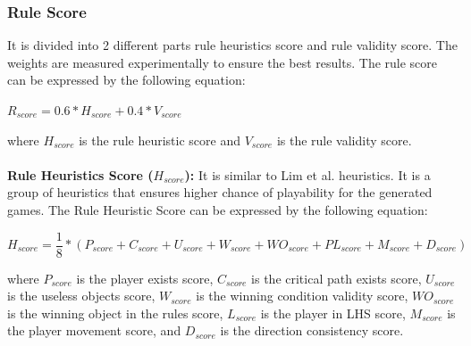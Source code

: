 \subsubsection{Rule Score}
It is divided into 2 different parts rule heuristics score and rule validity score. The weights are measured experimentally to ensure the best results. The rule score can be expressed by the following equation:
\begin{center}
$R_{score} = 0.6 * H_{score} + 0.4 * V_{score}$
\end{center}
where $H_{score}$ is the rule heuristic score and $V_{score}$ is the rule validity score.\\\\
\textbf{Rule Heuristics Score ($H_{score}$):} It is similar to Lim et al.\cite{puzzleScriptGeneration} heuristics. It is a group of heuristics that ensures higher chance of playability for the generated games. The Rule Heuristic Score can be expressed by the following equation:
\begin{center}
$H_{score} = \dfrac{1}{8} * (P_{score} + C_{score} + U_{score} + W_{score} + WO_{score} + PL_{score} + M_{score} + D_{score})$
\end{center}
where $P_{score}$ is the player exists score, $C_{score}$ is the critical path exists score, $U_{score}$ is the useless objects score, $W_{score}$ is the winning condition validity score, $WO_{score}$ is the winning object in the rules score, $L_{score}$ is the player in LHS score, $M_{score}$ is the player movement score, and $D_{score}$ is the direction consistency score.
